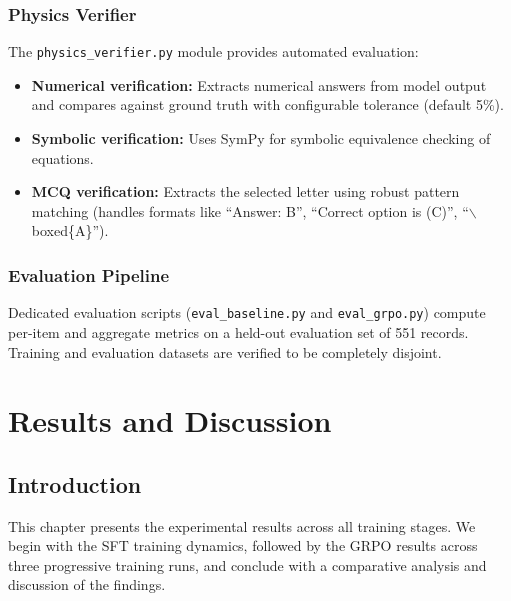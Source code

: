 \documentclass[12pt]{report}
\begin{document}
\subsection{Physics Verifier}

The \texttt{physics\_verifier.py} module provides automated evaluation:

\begin{itemize}
    \item \textbf{Numerical verification:} Extracts numerical answers from model output and compares against ground truth with configurable tolerance (default 5\%).
    \item \textbf{Symbolic verification:} Uses SymPy for symbolic equivalence checking of equations.
    \item \textbf{MCQ verification:} Extracts the selected letter using robust pattern matching (handles formats like ``Answer: B'', ``Correct option is (C)'', ``$\backslash$boxed\{A\}'').
\end{itemize}

\subsection{Evaluation Pipeline}

Dedicated evaluation scripts (\texttt{eval\_baseline.py} and \texttt{eval\_grpo.py}) compute per-item and aggregate metrics on a held-out evaluation set of 551 records. Training and evaluation datasets are verified to be completely disjoint.


\chapter{Results and Discussion}

\section{Introduction}

This chapter presents the experimental results across all training stages. We begin with the SFT training dynamics, followed by the GRPO results across three progressive training runs, and conclude with a comparative analysis and discussion of the findings.

\end{document}
